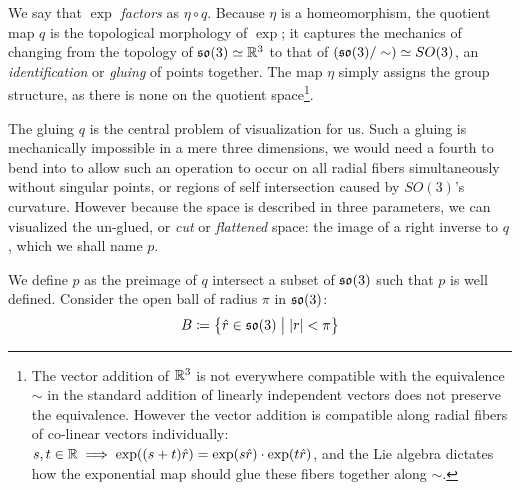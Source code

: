 \documentclass{amsart}
\theoremstyle{plain}
\theoremstyle{definition}
\begin{document}
    We say that $\exp$ \emph{factors} as $\eta\circ q$. Because $\eta$ is a homeomorphism, the quotient map $q$ is the topological morphology of $\exp$; it captures the mechanics of changing from the topology of $\mathfrak{so}(3)\simeq \mathbb{R}^3$ to that of $(\mathfrak{so}(3)/\sim)\simeq SO(3)$, an \emph{identification} or \emph{gluing} of points together. The map $\eta$ simply assigns the group structure, as there is none on the quotient space\footnote{The vector addition of $\mathbb{R}^3$ is not everywhere compatible with the equivalence $\sim$ in the standard addition of linearly independent vectors does not preserve the equivalence. However the vector addition is compatible along radial fibers of co-linear vectors individually: $s,t\in\mathbb{R}\implies \exp((s+t)\hat{r})=\exp(s\hat{r})\cdot\exp(t\hat{r})$, and the Lie algebra dictates how the exponential map should glue these fibers together along $\sim$.}.
    
    The gluing $q$ is the central problem of visualization for us. Such a gluing is mechanically impossible in a mere three dimensions, we would need a fourth to bend into to allow such an operation to occur on all radial fibers simultaneously without singular points, or regions of self intersection caused by $SO(3)$'s curvature. However because the space is described in three parameters, we can visualized the un-glued, or \emph{cut} or \emph{flattened} space: the image of a right inverse to $q$, which we shall name $p$.
    
    We define $p$ as the preimage of $q$ intersect a subset of $\mathfrak{so}(3)$ such that $p$ is well defined. Consider the open ball of radius $\pi$ in $\mathfrak{so}(3)$:
    \begin{equation}
        B\coloneqq\left\{\hat{r}\in\mathfrak{so}(3)\hspace{1mm}\big|\hspace{1mm} |r|<\pi\right\}
    \end{equation}
    
\end{document}
